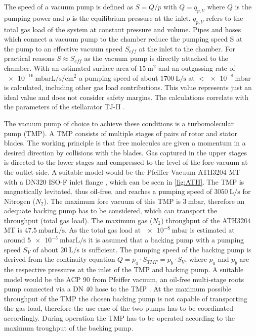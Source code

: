The speed of a vacuum pump is defined as $S=Q/p$ with $Q=q_{p,V}$ where $Q$ is the pumping power and $p$ is the equilibrium pressure at the inlet. $q_{p,V}$ refers to the total gas load of the system at constant pressure and volume.
Pipes and hoses which connect a vacuum pump to the chamber reduce the pumping speed S at the pump to an effective vacuum speed $S_{eff}$ at the inlet to the chamber.
For practical reasons $S\approx S_{eff}$ as the vacuum pump is directly attached to the chamber.
With an estimated surface area of $\SI{15}{\square\meter}$ and an outgassing rate of $\SI{e-10}{\milli\bar\liter\per\second\per\square\cm}$ a pumping speed of about $\SI{1700}{\liter\per\second}$ at $<\SI{e-8}{\milli\bar}$ is calculated, including other gas load contributions.
This value represents just an ideal value and does not consider safety margins.
The calculations correlate with the parameters of the stellarator TJ-II \cite{vacsystj2}.

The vacuum pump of choice to achieve these conditions is a turbomolecular pump (TMP). A TMP consists of multiple stages of pairs of rotor and stator blades. The working principle is that free molecules are given a momentum in a desired direction by collisions with the blades. Gas captured in the upper stages is directed to the lower stages and compressed to the level of the fore-vacuum at the outlet side. A suitable model would be the Pfeiffer Vacuum ATH3204 MT with a DN320 ISO-F inlet flange \cite{ATH3204}, which can be seen in \ref{fig:ATH}.
The TMP is magnetically levitated, thus oil-free, and reaches a pumping speed of $\SI{3050}{\liter\per\second}$ for Nitrogen ($N_{2}$).
The maximum fore vacuum of this TMP is $\SI{3}{\milli\bar}$, therefore an adequate backing pump has to be considered, which can transport the throughput (total gas load). The maximum gas ($N_{2}$) throughput of the ATH3204 MT is $\SI{47.5}{\milli\bar\liter\per\second}$. As the total gas load at $\SI{e-8}{\milli\bar}$ is estimated at around $\SI{5e-5}{\milli\bar\liter\per\second}$ it is assumed that a backing pump with a pumping speed $S_{V}$ of about $\SI{20}{\liter\per\second}$ is sufficient. The pumping speed of the backing pump is derived from the continuity equation $Q=p_{a}\cdot S_{TMP}=p_{b}\cdot S_{V}$, where $p_{a}$ and $p_{b}$ are the respective pressures at the inlet of the TMP and backing pump. A suitable model would be the ACP 90 from Pfeiffer vacuum, an oil-free multi-stage roots pump connected via a DN 40 hose to the TMP \cite{ACP90}. At the maximum possible throughput of the TMP the chosen backing pump is not capable of transporting the gas load, therefore the use case of the two pumps has to be coordinated accordingly. During operation the TMP has to be operated according to the maximum troughput of the backing pump.


